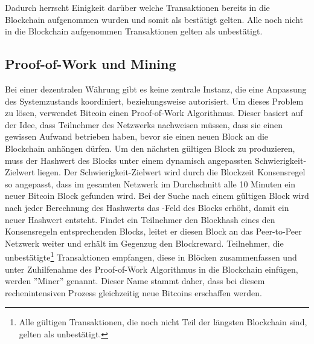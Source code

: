 \if Dadurch herrscht Einigkeit darüber welche Transaktionen bereits in die Blockchain aufgenommen wurden und somit als bestätigt gelten. Alle noch nicht in die Blockchain aufgenommen Transaktionen gelten als unbestätigt. \fi

\subsection{Proof-of-Work und Mining}
Bei einer dezentralen Währung gibt es keine zentrale Instanz, die eine Anpassung des Systemzustands koordiniert, beziehungsweise autorisiert. Um dieses Problem zu lösen, verwendet Bitcoin einen Proof-of-Work Algorithmus. Dieser basiert auf der Idee, dass Teilnehmer des Netzwerks nachweisen müssen, dass sie einen gewissen Aufwand betrieben haben, bevor sie einen neuen Block an die Blockchain anhängen dürfen. Um den nächsten gültigen Block zu produzieren, muss der Hashwert des Blocks unter einem dynamisch angepassten Schwierigkeit-Zielwert liegen. Der Schwierigkeit-Zielwert wird durch die Blockzeit Konsensregel so angepasst, dass im gesamten Netzwerk im Durchschnitt alle 10 Minuten ein neuer Bitcoin Block gefunden wird.\newpage
\noindent Bei der Suche nach einem gültigen Block wird nach jeder Berechnung des Hashwerts das -Feld des Blocks erhöht, damit ein neuer Hashwert entsteht. Findet ein Teilnehmer den Blockhash eines den Konsensregeln entsprechenden Blocks, leitet er diesen Block an das Peer-to-Peer Netzwerk weiter und erhält im Gegenzug den Blockreward. Teilnehmer, die unbestätigte\footnote{Alle gültigen Transaktionen, die noch nicht Teil der längsten Blockchain sind, gelten als unbestätigt.} Transaktionen empfangen, diese in Blöcken zusammenfassen und unter Zuhilfenahme des Proof-of-Work Algorithmus in die Blockchain einfügen, werden ''Miner'' genannt. Dieser Name stammt daher, dass bei diesem rechenintensiven Prozess gleichzeitig neue Bitcoins erschaffen werden.


